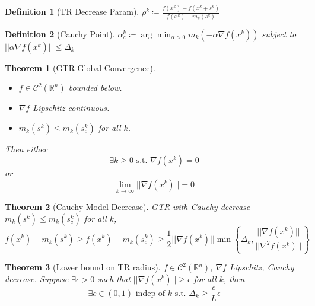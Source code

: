 \documentclass[a4paper]{article}
\newcommand{\R}{\mathbb{R}}
\newcommand{\C}{\mathcal{C}}
\newcommand{\st}{\text{ s.t. }}
\newcommand{\norm}[1]{\lvert \lvert #1 \rvert \rvert}
\newtheorem{theorem}{Theorem}
\newtheorem*{definition*}{Definition}
\begin{document}
\begin{definition*}[TR Decrease Param]
    $\rho^k \coloneqq \frac{f\left( x^k \right) - f\left( x^k + s^k \right)}{f\left( x^k \right) - m_k \left( s^k \right)}$
\end{definition*}

\begin{definition*}[Cauchy Point]
    $\alpha_c^k \coloneqq \arg \min_{\alpha > 0} m_{k} \left( -\alpha \nabla f \left( x^k \right) \right)$ subject to $\norm{\alpha \nabla f \left( x^k \right)} \leq \Delta_k$
\end{definition*}

\setcounter{theorem}{10}
\begin{theorem}[GTR Global Convergence]
    \phantom \\
    \begin{itemize}
        \item $f \in \C^2 \left( \R^n \right)$ bounded below.
        \item $\nabla f$ Lipschitz continuous.
        \item $m_k \left( s^k \right) \leq m_k \left( s_c^k \right)$ for all $k$.
    \end{itemize}
    Then either
    \begin{equation*}
        \exists k \geq 0 \st \nabla f \left( x^k \right) = 0
    \end{equation*}
    or
    \begin{equation*}
        \lim_{k \rightarrow \infty} \norm{\nabla f \left( x^k \right)} = 0
    \end{equation*}
\end{theorem}

\begin{theorem}[Cauchy Model Decrease]
    GTR with Cauchy decrease $m_k \left( s^k \right) \leq m_k \left( s_c^k \right)$ for all $k$,
    \begin{equation*}
        f\left( x^k \right) - m_k \left( s^k \right) \geq f \left( x^k \right) - m_k \left( s_c^k \right) \geq \frac{1}{2} \norm{\nabla f \left( x^k \right)} \min \left\{ \Delta_k, \frac{\norm{\nabla f \left( x^k \right)}}{\norm{\nabla^2 f \left( x^k \right)}} \right\}
    \end{equation*}
\end{theorem}

\begin{theorem}[Lower bound on TR radius]
    $f \in \C^2 \left( \R^n \right)$, $\nabla f$ Lipschitz, Cauchy decrease.
    Suppose $\exists \epsilon > 0$ such that $\norm{\nabla f \left( x^k \right)} \geq \epsilon$ for all $k$, then
    \begin{equation*}
        \exists c \in \left( 0, 1 \right) \text{ indep of } k \st \Delta_k \geq \frac{c}{L} \epsilon
    \end{equation*}
\end{theorem}
\end{document}
